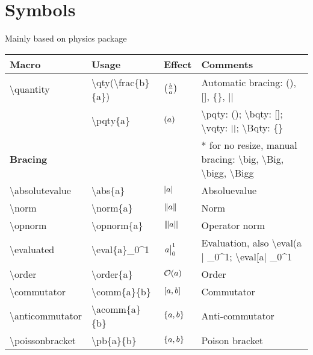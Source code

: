 \documentclass{article}
\def\tbs{\textbackslash}
\begin{document}
\section{Symbols}

Mainly based on physics package

\begin{center}
\begin{table}[htp]
    \begin{tabular}{|p{3cm}||l|l|p{6cm}|}
    \toprule
    Macro                     & Usage                            & Effect                   & Comments \\
    \midrule \midrule
    \tbs quantity             & \tbs qty(\tbs frac\{b\}\{a\})    & $\qty(\frac{b}{a})$      & Automatic bracing: (), [], \{\}, $\vert\vert$
    \\ \hline
                              & \tbs pqty\{a\}                   & $\pqty{a}$               & \tbs pqty: (); \tbs bqty: []; \tbs vqty: $\abs{}$; \tbs Bqty: \{\}
    \\ \hline \hline
    \textbf{Bracing}          &                                  &                          & * for no resize, manual bracing: \tbs big, \tbs Big, \tbs bigg, \tbs Bigg
    \\ \hline
    \tbs absolutevalue        & \tbs abs\{a\}                    & $\abs{a}$                & Absoluevalue
    \\ \hline
    \tbs norm                 & \tbs norm\{a\}                   & $\norm{a}$               & Norm
    \\ \hline
    \tbs opnorm               & \tbs opnorm\{a\}                 & $\left\vert\kern-0.25ex\left\vert\kern-0.25ex\left\vert a \right\vert\kern-0.25ex\right\vert\kern-0.25ex\right\vert$             & Operator norm
    \\ \hline
    \tbs evaluated            & \tbs eval\{a\}\_0\^{}1           & $\eval{a}_0^1$           & Evaluation, also \tbs eval(a$\vert$ \_0\^{}1; \tbs eval[a$\vert$ \_0\^{}1
    \\ \hline
    \tbs order                & \tbs order\{a\}                  & $\order{a}$              & Order
    \\ \hline
    \tbs commutator           & \tbs comm\{a\}\{b\}              & $\comm{a}{b}$            & Commutator
    \\ \hline
    \tbs anticommutator       & \tbs acomm\{a\}\{b\}             & $\acomm{a}{b}$           & Anti-commutator
    \\ \hline
    \tbs poissonbracket       & \tbs pb\{a\}\{b\}                & $\pb{a}{b}$              & Poison bracket
    \\ \hline \hline

\end{tabular}
\end{table}
\end{center}
\end{document}
